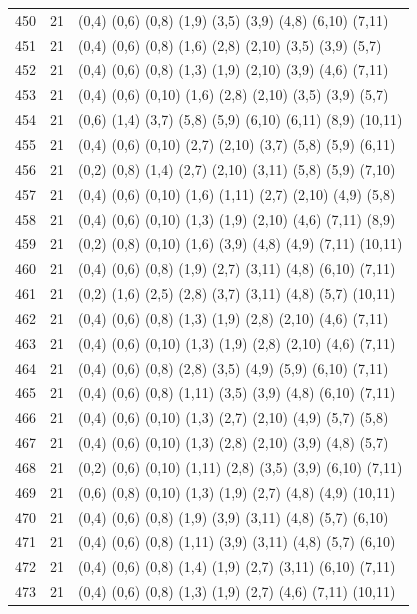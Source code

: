 {\begin{longtable}{lll}
450 & 21 & (0,4) (0,6) (0,8) (1,9) (3,5) (3,9) (4,8) (6,10) (7,11) \\
451 & 21 & (0,4) (0,6) (0,8) (1,6) (2,8) (2,10) (3,5) (3,9) (5,7) \\
452 & 21 & (0,4) (0,6) (0,8) (1,3) (1,9) (2,10) (3,9) (4,6) (7,11) \\
453 & 21 & (0,4) (0,6) (0,10) (1,6) (2,8) (2,10) (3,5) (3,9) (5,7) \\
454 & 21 & (0,6) (1,4) (3,7) (5,8) (5,9) (6,10) (6,11) (8,9) (10,11) \\
455 & 21 & (0,4) (0,6) (0,10) (2,7) (2,10) (3,7) (5,8) (5,9) (6,11) \\
456 & 21 & (0,2) (0,8) (1,4) (2,7) (2,10) (3,11) (5,8) (5,9) (7,10) \\
457 & 21 & (0,4) (0,6) (0,10) (1,6) (1,11) (2,7) (2,10) (4,9) (5,8) \\
458 & 21 & (0,4) (0,6) (0,10) (1,3) (1,9) (2,10) (4,6) (7,11) (8,9) \\
459 & 21 & (0,2) (0,8) (0,10) (1,6) (3,9) (4,8) (4,9) (7,11) (10,11) \\
460 & 21 & (0,4) (0,6) (0,8) (1,9) (2,7) (3,11) (4,8) (6,10) (7,11) \\
461 & 21 & (0,2) (1,6) (2,5) (2,8) (3,7) (3,11) (4,8) (5,7) (10,11) \\
462 & 21 & (0,4) (0,6) (0,8) (1,3) (1,9) (2,8) (2,10) (4,6) (7,11) \\
463 & 21 & (0,4) (0,6) (0,10) (1,3) (1,9) (2,8) (2,10) (4,6) (7,11) \\
464 & 21 & (0,4) (0,6) (0,8) (2,8) (3,5) (4,9) (5,9) (6,10) (7,11) \\
465 & 21 & (0,4) (0,6) (0,8) (1,11) (3,5) (3,9) (4,8) (6,10) (7,11) \\
466 & 21 & (0,4) (0,6) (0,10) (1,3) (2,7) (2,10) (4,9) (5,7) (5,8) \\
467 & 21 & (0,4) (0,6) (0,10) (1,3) (2,8) (2,10) (3,9) (4,8) (5,7) \\
468 & 21 & (0,2) (0,6) (0,10) (1,11) (2,8) (3,5) (3,9) (6,10) (7,11) \\
469 & 21 & (0,6) (0,8) (0,10) (1,3) (1,9) (2,7) (4,8) (4,9) (10,11) \\
470 & 21 & (0,4) (0,6) (0,8) (1,9) (3,9) (3,11) (4,8) (5,7) (6,10) \\
471 & 21 & (0,4) (0,6) (0,8) (1,11) (3,9) (3,11) (4,8) (5,7) (6,10) \\
472 & 21 & (0,4) (0,6) (0,8) (1,4) (1,9) (2,7) (3,11) (6,10) (7,11) \\
473 & 21 & (0,4) (0,6) (0,8) (1,3) (1,9) (2,7) (4,6) (7,11) (10,11) \\

\end{longtable}}
